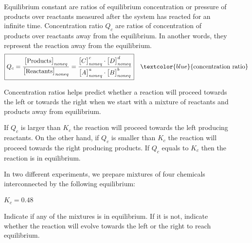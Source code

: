 \documentclass[main.tex]{subfiles}
\newcommand\chapterlabel{equilibrium}
\begin{document}
\begin{description}
\item[] 
Equilibrium constant are ratios of equilibrium concentration or pressure of products over reactants measured after the system has reacted for an infinite time.
Concentration ratio $Q_c$ are ratios of concentration of products over reactants away from the equilibrium. In another words, they represent the reaction away from the equilibrium.
\begin{equation}
\boxed{  Q_{c}=\frac{\big[\text{Products}\big]_{noneq}}{\big[\text{Reactants}\big]_{noneq}}=\frac{\big[ C \big]_{noneq}^c \cdot \big[ D \big]_{noneq}^d} {\big[ A \big]_{noneq}^a \cdot \big[ B \big]_{noneq}^b} } \quad \textcolor{blue}{\text{concentration ratio}}\label{\chapterlabel:equation4}
\end{equation}

\item[] 
Concentration ratios helps predict whether a reaction will proceed towards the left or towards the right when we start with a mixture of reactants and products away from equilibrium.
 \begin{center}  \end{center}
If $Q_c$ is larger than $K_c$ the reaction will proceed towards the left producing reactants. On the other hand, if $Q_c$ is smaller than $K_c$ the reaction will proceed towards the right producing products. If $Q_c$ equals to $K_c$ then the reaction is in equilibrium.

\begin{example} %
In two different experiments, we prepare mixtures of four chemicals interconnected by the following equilibrium:
\begin{center}\hfill $K_c =0.48$\end{center}
Indicate if any of the mixtures is in equilibrium. If it is not, indicate whether the reaction will evolve towards the left or the right to reach equilibrium.


\end{example}
\end{description}
\end{document}
